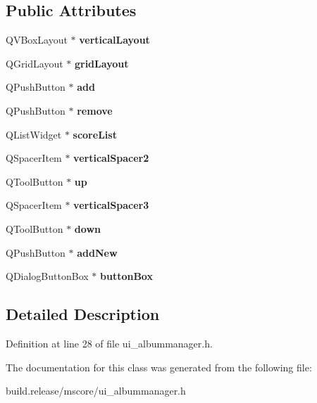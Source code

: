 \subsection*{Public Attributes}
\begin{DoxyCompactItemize}
\item 
\mbox{\label{class_ui___album_manager_ae6cc4c865a07d131356e376aa03c4b8c}} 
Q\+V\+Box\+Layout $\ast$ {\bfseries vertical\+Layout}
\item 
\mbox{\label{class_ui___album_manager_ac76068c12937e2c85998feb1e1e21eef}} 
Q\+Grid\+Layout $\ast$ {\bfseries grid\+Layout}
\item 
\mbox{\label{class_ui___album_manager_af626b908e1cdda2e48352988f750ca6a}} 
Q\+Push\+Button $\ast$ {\bfseries add}
\item 
\mbox{\label{class_ui___album_manager_af4147b4314303b24c09c316779ead3d6}} 
Q\+Push\+Button $\ast$ {\bfseries remove}
\item 
\mbox{\label{class_ui___album_manager_a583991c097ca91c508456f5504de1bcc}} 
Q\+List\+Widget $\ast$ {\bfseries score\+List}
\item 
\mbox{\label{class_ui___album_manager_ad1d5a850b9bec0d3aa38111c2a86ed2f}} 
Q\+Spacer\+Item $\ast$ {\bfseries vertical\+Spacer2}
\item 
\mbox{\label{class_ui___album_manager_adbf5759c8bd98a89f0bc7c34a9513afd}} 
Q\+Tool\+Button $\ast$ {\bfseries up}
\item 
\mbox{\label{class_ui___album_manager_ad24fe8805ca1cafd5fca4f40f144aaab}} 
Q\+Spacer\+Item $\ast$ {\bfseries vertical\+Spacer3}
\item 
\mbox{\label{class_ui___album_manager_adb41633b412799874c2ed8b2c341051f}} 
Q\+Tool\+Button $\ast$ {\bfseries down}
\item 
\mbox{\label{class_ui___album_manager_a500a5003356b12bbb9059653b81abdb8}} 
Q\+Push\+Button $\ast$ {\bfseries add\+New}
\item 
\mbox{\label{class_ui___album_manager_a7c2815e80e13f58773870424c36ccab9}} 
Q\+Dialog\+Button\+Box $\ast$ {\bfseries button\+Box}
\end{DoxyCompactItemize}


\subsection{Detailed Description}


Definition at line 28 of file ui\+\_\+albummanager.\+h.



The documentation for this class was generated from the following file\+:\begin{DoxyCompactItemize}
\item 
build.\+release/mscore/ui\+\_\+albummanager.\+h\end{DoxyCompactItemize}
